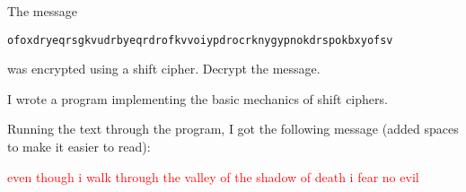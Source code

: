 \begin{problem}
The message 
\begin{center}
\texttt{ofoxdryeqrsgkvudrbyeqrdrofkvvoiypdrocrknygypnokdrspokbxyofsv}
\end{center}
was encrypted using a shift cipher.  Decrypt the message.
\end{problem}

\begin{Answer}
  I wrote a program implementing the basic mechanics of shift ciphers.

  Running the text through the program,
  I got the following message (added spaces to make it easier to read):

  \begin{center}
    \textcolor{red}{even though i walk through the valley of the
    shadow of death i fear no evil}
  \end{center}
\end{Answer}
